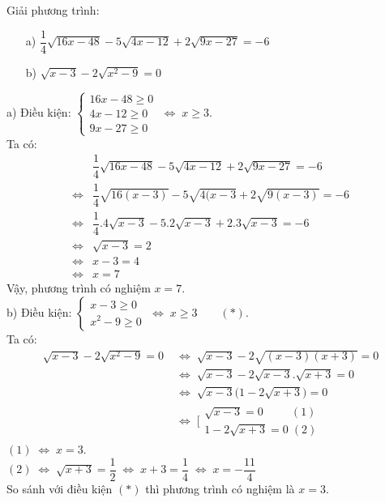 \begin{ex}%
	Giải phương trình:
	\begin{itemize}
	\item[a)] $\dfrac{1}{4}\sqrt{16x-48}-5\sqrt{4x-12}+2\sqrt{9x-27}=-6$
	\item[b)] $\sqrt{x-3}-2\sqrt{x^2-9}=0$
	\end{itemize}
	\loigiai
	{
	a) Điều kiện: $\left\{\begin{array}{l}
	16x-48\geq 0\\
	4x-12\geq 0\\
	9x-27\geq 0
	\end{array}\right. \;\Leftrightarrow\;x\geq3$.\\
	Ta có:
	$$\begin{matrix}
	&\dfrac{1}{4}\sqrt{16x-48}-5\sqrt{4x-12}+2\sqrt{9x-27}=-6\\
	\Leftrightarrow & \dfrac{1}{4}\sqrt{16(x-3)}-5\sqrt{4(x-3}+2\sqrt{9(x-3)}=-6\\
	\Leftrightarrow & \dfrac{1}{4}.4\sqrt{x-3}-5.2\sqrt{x-3}+2.3\sqrt{x-3}=-6\\
	\Leftrightarrow & \sqrt{x-3}=2\\
	\Leftrightarrow & x-3=4\\
	\Leftrightarrow & x=7
	\end{matrix}$$
	Vậy, phương trình có nghiệm $x=7$.\\
	b) Điều kiện: $\left\{\begin{array}{l}x-3 \geq 0 \\ x^2-9 \geq 0 \end{array}\right.\;\Leftrightarrow\;x\geq 3 \qquad (*)$.\\
	Ta có:
	\begin{align*}
	\sqrt{x-3}-2\sqrt{x^2-9}=0 \;&\Leftrightarrow\; \sqrt{x-3}-2\sqrt{(x-3)(x+3)}=0\\
	&\Leftrightarrow\; \sqrt{x-3}-2\sqrt{x-3}.\sqrt{x+3}=0\\
	&\Leftrightarrow\; \sqrt{x-3}\big(1-2\sqrt{x+3}\big)=0\\
	&\Leftrightarrow\; \Bigg[ \begin{array}{l}
	\sqrt{x-3}=0 \; \, \qquad (1)\\
	1-2\sqrt{x+3}=0\;(2)
	\end{array}
	\end{align*}
	$(1)\;\Leftrightarrow\;x=3$.\\
	$(2)\;\Leftrightarrow\;\sqrt{x+3}=\dfrac{1}{2}\;\Leftrightarrow\;x+3=\dfrac{1}{4}\;\Leftrightarrow\; x=-\dfrac{11}{4}$ \\
	So sánh với điều kiện $(*)$ thì phương trình có nghiệm là $x=3$.
	}
\end{ex}

